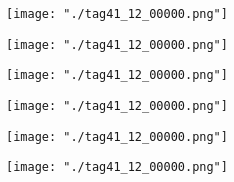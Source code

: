\documentclass{article}
\begin{document}
\begin{figure}[h]
\centering
\texttt{[image: "./tag41\_12\_00000.png"]}
\end{figure}
\begin{figure}[h]
\centering
\texttt{[image: "./tag41\_12\_00000.png"]}
\end{figure}
\begin{figure}[h]
\centering
\texttt{[image: "./tag41\_12\_00000.png"]}
\end{figure}
\begin{figure}[h]
\centering
\texttt{[image: "./tag41\_12\_00000.png"]}
\end{figure}
\begin{figure}[h]
\centering
\texttt{[image: "./tag41\_12\_00000.png"]}
\end{figure}
\begin{figure}[h]
\centering
\texttt{[image: "./tag41\_12\_00000.png"]}
\end{figure}
\end{document}
